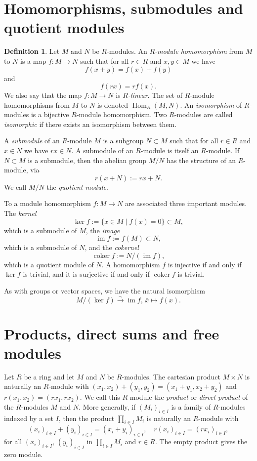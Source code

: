 \documentclass[11pt]{amsbook}
\newcommand{\isomto}{\overset{\sim}{\to}}
\DeclareMathOperator\Hom{Hom}
\DeclareMathOperator\im{im}
\DeclareMathOperator\coker{coker}
\theoremstyle{plain}
\theoremstyle{definition}
\newtheorem{definition}[theorem]{Definition}
\begin{document}
\section{Homomorphisms, submodules and quotient modules}

\begin{definition} Let $M$ and $N$ be $R$-modules. An \emph{$R$-module homomorphism} from $M$ to $N$ is a map $f\colon M\to N$ such that for all $r\in R$ and $x,y\in M$ we have
\[
	f(x+y)=f(x)+f(y)
\]
and
\[
	f(rx) = r f(x).
\]
We also say that the map $f\colon M\to N$ is \emph{$R$-linear}. The set of $R$-module homomorphisms from $M$ to $N$ is denoted $\Hom_R(M,N)$. An \emph{isomorphism} of $R$-modules is a bijective $R$-module homomorphism. Two $R$-modules are called \emph{isomorphic} if there exists an  isomorphism between them.
\end{definition}




A \emph{submodule} of an $R$-module $M$ is a subgroup $N\subset M$ such that for all $r\in R$ and $x\in N$ we have $rx\in N$. A submodule of an $R$-module is itself an $R$-module. If $N\subset M$ is a submodule, then the abelian group $M/N$ has the structure of an $R$-module, via
\[
	r(x+N) := rx + N.
\]
We call $M/N$ the \emph{quotient module}.

To a module homomorphism $f\colon M \to N$ are associated three important modules. The \emph{kernel}
\[
	\ker f := \{ x\in M \mid f(x)=0 \} \subset M,
\]
which is a submodule of $M$, the \emph{image}
\[
	\im f := f(M) \subset N,
\]
which is a submodule of $N$, and the \emph{cokernel}
\[
	\coker f := N/(\im f),
\]
which is a quotient module of $N$. A homomorphism $f$ is injective if and only if $\ker f$ is trivial, and it is surjective if and only if $\coker f$ is trivial.

As with groups or vector spaces, we have the natural isomorphism
\[
	M/(\ker f) \isomto \im f,\, \bar{x} \mapsto f(x).
\]

\section{Products, direct sums and free modules}\label{sec:products-and-direct-sums}

Let $R$ be a ring and let $M$ and $N$ be $R$-modules. The cartesian product $M\times N$ is naturally an $R$-module with $(x_1,x_2)+(y_1,y_2)=(x_1+y_1,x_2+y_2)$ and $r(x_1,x_2)=(rx_1,rx_2)$. We call this $R$-module the \emph{product} or \emph{direct product} of the $R$-modules $M$ and $N$.  More generally, if $(M_i)_{i\in I}$ is a family of $R$-modules indexed by a set $I$, then the product $\prod_{i\in I} M_i$ is naturally an $R$-module with
\[
	(x_i)_{i\in I} + (y_i)_{i\in I} = (x_i+y_i)_{i\in I},\quad r(x_i)_{i\in I} = (rx_i)_{i \in I},
\]
for all $(x_i)_{i\in I}$,  $(y_i)_{i\in I}$ in $\prod_{i\in I} M_i$ and $r\in R$. The empty product gives the zero module.  
\end{document}
